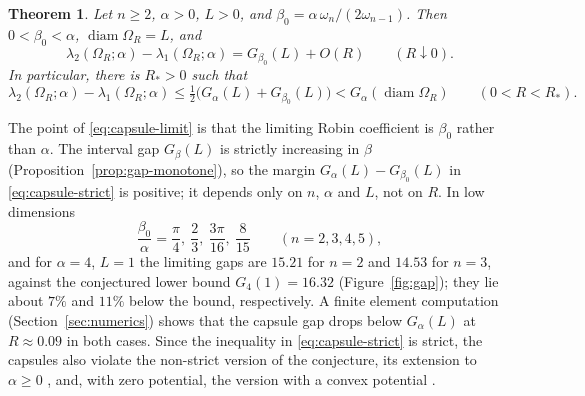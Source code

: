 \documentclass[11pt,a4paper]{article}
\numberwithin{equation}{section}
\theoremstyle{paperplain}
\newtheorem{theorem}{Theorem}[section]
\theoremstyle{remark}
\newcommand{\diam}{\operatorname{diam}}
\begin{document}
\begin{theorem}\label{thm:intro-counter}
Let $n\ge2$, $\alpha>0$, $L>0$, and $\beta_0=\alpha\,\omega_n/(2\omega_{n-1})$.
Then $0<\beta_0<\alpha$, $\diam\Omega_R=L$, and
\begin{equation}\label{eq:capsule-limit}
 \lambda_2(\Omega_R;\alpha)-\lambda_1(\Omega_R;\alpha)
 =G_{\beta_0}(L)+O(R)\qquad(R\downarrow0).
\end{equation}
In particular, there is $R_*>0$ such that
\begin{equation}\label{eq:capsule-strict}
 \lambda_2(\Omega_R;\alpha)-\lambda_1(\Omega_R;\alpha)
 \le\tfrac12\bigl(G_\alpha(L)+G_{\beta_0}(L)\bigr)
 <G_\alpha(\diam\Omega_R)\qquad(0<R<R_*).
\end{equation}
\end{theorem}

The point of \eqref{eq:capsule-limit} is that the limiting Robin coefficient
is $\beta_0$ rather than $\alpha$. The interval gap $G_\beta(L)$ is strictly
increasing in $\beta$ \cite{Smits} (Proposition~\ref{prop:gap-monotone}),
so the margin $G_\alpha(L)-G_{\beta_0}(L)$ in \eqref{eq:capsule-strict} is
positive; it depends only on $n$, $\alpha$ and $L$, not on $R$. In low
dimensions
\[
 \frac{\beta_0}{\alpha}=\frac\pi4,\ \frac23,\ \frac{3\pi}{16},\ \frac8{15}
 \qquad(n=2,3,4,5),
\]
and for $\alpha=4$, $L=1$ the limiting gaps are $15.21$ for $n=2$ and
$14.53$ for $n=3$, against the conjectured lower bound $G_4(1)=16.32$
(Figure~\ref{fig:gap}); they lie about $7\%$ and $11\%$ below the bound,
respectively. A finite element computation (Section~\ref{sec:numerics})
shows that the capsule gap drops below $G_\alpha(L)$ at $R\approx0.09$ in
both cases. Since the inequality in \eqref{eq:capsule-strict} is strict,
the capsules also violate the non-strict version of the conjecture, its
extension to $\alpha\ge0$ \cite{Kielty}, and, with zero potential, the
version with a convex potential \cite[Section~10]{ACH}.
\end{document}
